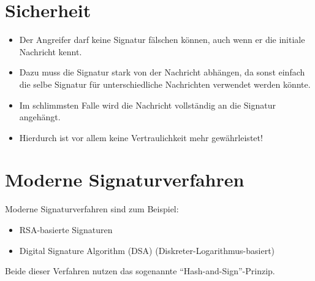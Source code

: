 \documentclass[a4paper, 11pt, accentcolor = tud3b]{tudreport}
\begin{document}
        \section{Sicherheit}
            \begin{itemize}
            	\item Der Angreifer darf keine Signatur fälschen können, auch wenn er die initiale Nachricht kennt.
            	\item Dazu muss die Signatur stark von der Nachricht abhängen, da sonst einfach die selbe Signatur für unterschiedliche Nachrichten verwendet werden könnte.
            	\item Im schlimmsten Falle wird die Nachricht vollständig an die Signatur angehängt.
            	\item Hierdurch ist vor allem keine Vertraulichkeit mehr gewährleistet!
            \end{itemize}

        \section{Moderne Signaturverfahren}
	        Moderne Signaturverfahren sind zum Beispiel:
            \begin{itemize}
            	\item RSA-basierte Signaturen
            	\item Digital Signature Algorithm (DSA) (Diskreter-Logarithmus-basiert)
            \end{itemize}
	        Beide dieser Verfahren nutzen das sogenannte \enquote{Hash-and-Sign}-Prinzip.
\end{document}
